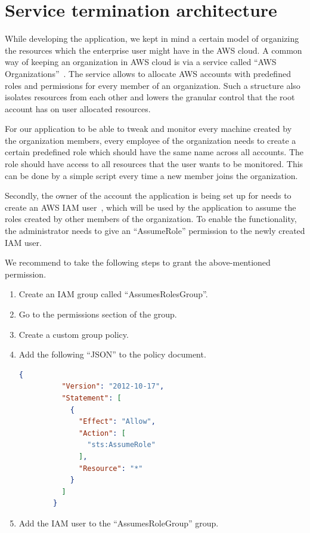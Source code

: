 \documentclass[licencjacka,en]{thesisclass}
\begin{document}
    \section{Service termination architecture}
    While developing the application, we kept in mind a certain model
    of organizing the resources
    which the enterprise user might have in the AWS cloud.
    A common way of keeping an organization in AWS cloud
    is via a service called “AWS Organizations”~\cite{AWSOrganizations}.
    The service allows to allocate AWS accounts
    with predefined roles and permissions for every member of an organization.
    Such a structure also isolates resources from each other
    and lowers the granular control that the root account has on user allocated resources.

    For our application to be able to tweak and monitor every machine
    created by the organization members, every employee of the organization
    needs to create a certain predefined role
    which should have the same name across all accounts.
    The role should have access to all resources that the user wants to be monitored.
    This can be done by a simple script every time a new member joins the organization.

    Secondly, the owner of the account the application is being set up for
    needs to create an AWS IAM user~\cite{AWSIAM},
    which will be used by the application to assume
    the roles created by other members of the organization.
    To enable the functionality, the administrator needs
    to give an “AssumeRole” permission to the newly created IAM user.

    We recommend to take the following steps to grant the above-mentioned permission.


    \begin{enumerate}
        \item Create an IAM group called “AssumesRolesGroup”.
        \item Go to the permissions section of the group.
        \item Create a custom group policy.
        \item Add the following “JSON” to the policy document.

        \begin{lstlisting}[language=json,firstnumber=1]
        {
          "Version": "2012-10-17",
          "Statement": [
            {
              "Effect": "Allow",
              "Action": [
                "sts:AssumeRole"
              ],
              "Resource": "*"
            }
          ]
        }
        \end{lstlisting}

        \item Add the IAM user to the “AssumesRoleGroup” group.
    \end{enumerate}
\end{document}
